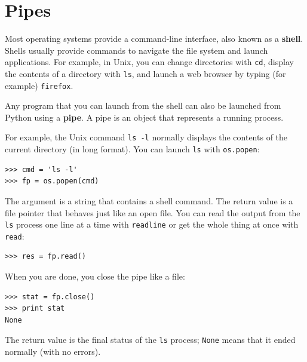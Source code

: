\documentclass[10pt]{book}
\begin{document}
\section{Pipes}


Most operating systems provide a command-line interface,
also known as a {\bf shell}.  Shells usually provide commands
to navigate the file system and launch applications.  For
example, in Unix, you can change directories with {\tt cd},
display the contents of a directory with {\tt ls}, and launch
a web browser by typing (for example) {\tt firefox}.


Any program that you can launch from the shell can also be
launched from Python using a {\bf pipe}.  A pipe is an object
that represents a running process.

For example, the Unix command {\tt ls -l} normally displays the
contents of the current directory (in long format).  You can
launch {\tt ls} with {\tt os.popen}:


\beforeverb
\begin{verbatim}
>>> cmd = 'ls -l'
>>> fp = os.popen(cmd)
\end{verbatim}
\afterverb
%
The argument is a string that contains a shell command.  The
return value is a file pointer that behaves just like an open
file.  You can read the output from the {\tt ls} process one
line at a time with {\tt readline} or get the whole thing at
once with {\tt read}:


\beforeverb
\begin{verbatim}
>>> res = fp.read()
\end{verbatim}
\afterverb
%
When you are done, you close the pipe like a file:


\beforeverb
\begin{verbatim}
>>> stat = fp.close()
>>> print stat
None
\end{verbatim}
\afterverb
%
The return value is the final status of the {\tt ls} process;
{\tt None} means that it ended normally (with no errors).

\end{document}
